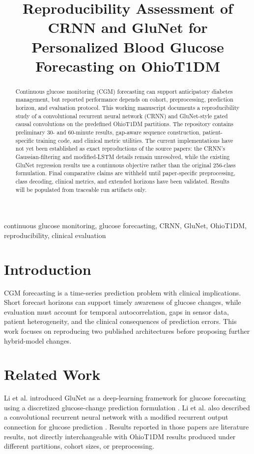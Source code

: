 \documentclass[conference]{IEEEtran}
\title{Reproducibility Assessment of CRNN and GluNet for Personalized Blood Glucose Forecasting on OhioT1DM}
\author{\IEEEauthorblockN{Sulabh Yadav}\IEEEauthorblockA{Working manuscript; affiliations and target venue to be added}}
\begin{document}
\maketitle
\begin{abstract}
Continuous glucose monitoring (CGM) forecasting can support anticipatory diabetes management, but reported performance depends on cohort, preprocessing, prediction horizon, and evaluation protocol. This working manuscript documents a reproducibility study of a convolutional recurrent neural network (CRNN) and GluNet-style gated causal convolutions on the predefined OhioT1DM partitions. The repository contains preliminary 30- and 60-minute results, gap-aware sequence construction, patient-specific training code, and clinical metric utilities. The current implementations have not yet been established as exact reproductions of the source papers: the CRNN's Gaussian-filtering and modified-LSTM details remain unresolved, while the existing GluNet regression results use a continuous objective rather than the original 256-class formulation. Final comparative claims are withheld until paper-specific preprocessing, class decoding, clinical metrics, and extended horizons have been validated. Results will be populated from traceable run artifacts only.
\end{abstract}
\begin{IEEEkeywords}
continuous glucose monitoring, glucose forecasting, CRNN, GluNet, OhioT1DM, reproducibility, clinical evaluation
\end{IEEEkeywords}

\section{Introduction}
CGM forecasting is a time-series prediction problem with clinical implications. Short forecast horizons can support timely awareness of glucose changes, while evaluation must account for temporal autocorrelation, gaps in sensor data, patient heterogeneity, and the clinical consequences of prediction errors. This work focuses on reproducing two published architectures before proposing further hybrid-model changes.

\section{Related Work}
Li et al. introduced GluNet as a deep-learning framework for glucose forecasting using a discretized glucose-change prediction formulation \cite{li_glunet}. Li et al. also described a convolutional recurrent neural network with a modified recurrent output connection for glucose prediction \cite{li_crnn}. Results reported in those papers are literature results, not directly interchangeable with OhioT1DM results produced under different partitions, cohort sizes, or preprocessing.
\end{document}
